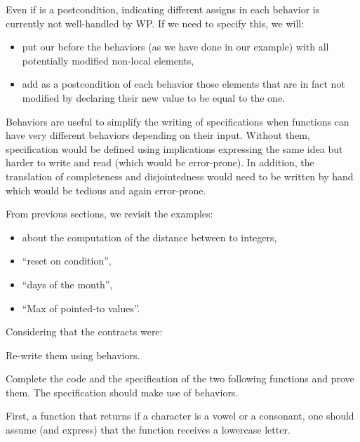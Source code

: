 \begin{Warning}
  Even if  is a postcondition, indicating different assigns
  in each behavior is currently not well-handled by WP. If we need to specify
  this, we will:
  \begin{itemize}
  \item put our  before the behaviors (as we have done in our
    example) with all potentially modified non-local elements,
  \item add as a postcondition of each behavior those elements that are in fact
    not modified by declaring their new value to be equal to the
     one.
  \end{itemize}
\end{Warning}


Behaviors are useful to simplify the writing of specifications when
functions can have very different behaviors depending on their input.
Without them, specification would be defined using implications
expressing the same idea but harder to write and read (which would be
error-prone). In addition, the translation of completeness and
disjointedness would need to be written by hand which would be
tedious and again error-prone.






From previous sections, we revisit the examples:
\begin{itemize}
\item about the computation of the distance between to integers,
\item ``reset on condition'',
\item ``days of the month'',
\item ``Max of pointed-to values''.
\end{itemize}


Considering that the contracts were:




Re-write them using behaviors.




Complete the code and the specification of the two following functions
and prove them. The specification should make use of behaviors.


First, a function that returns if a character is a vowel or a consonant,
one should assume (and express) that the function receives a lowercase
letter.


